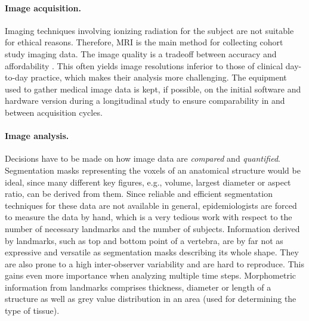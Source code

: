 \documentclass[journal]{style/vgtc} 			          %
\begin{document}
\paragraph{Image acquisition.} \label{ImageAcquisition} Imaging techniques involving ionizing radiation for the subject are not suitable for ethical reasons.
%
Therefore, MRI is the main method for collecting cohort study imaging data.
%
The image quality is a tradeoff between accuracy and affordability \cite{Preim2014}.
%
This often yields image resolutions inferior to those of clinical day-to-day practice, which makes their analysis more challenging.
The equipment used to gather medical image data is kept, if possible, on the initial software and hardware version during a longitudinal study to ensure comparability in and between acquisition cycles.

\paragraph{Image analysis.} \label{ImageAnalysis} Decisions have to be made on how image data are \emph{compared} and \emph{quantified}.
%
Segmentation masks representing the voxels of an anatomical structure would be ideal, since many different key figures, e.g., volume, largest diameter or aspect ratio, can be derived from them.
%
Since reliable and efficient segmentation techniques for these data are not available in general, epidemiologists are forced to measure the data by hand, which is a very tedious work with respect to the number of necessary landmarks and the number of subjects.
%
Information derived by landmarks, such as top and bottom point of a vertebra, are by far not as expressive and versatile as segmentation masks describing its whole shape.
%
They are also prone to a high inter-observer variability and are hard to reproduce.
%
This gains even more importance when analyzing multiple time steps.
%
Morphometric information from landmarks comprises thickness, diameter or length of a structure as well as grey value distribution in an area (used for determining the type of tissue).
\end{document}
